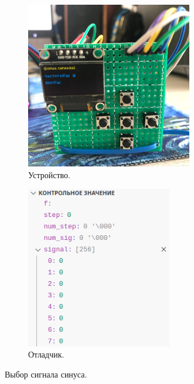 	\begin{figure}[H]
     \begin{subfigure}[H]{0.5\textwidth}
         \centering
         \includegraphics[width=0.8\textwidth]{../image/test0_u_s.jpg}
         \caption{Устройство.}
     \end{subfigure}
     \hfill
     \begin{subfigure}[H]{0.5\textwidth}
         \centering
         \includegraphics[width=0.7\textwidth]{../image/test0_o_s.png}
         \caption{Отладчик.}
     \end{subfigure}
        \caption{Выбор сигнала синуса.}
	\end{figure}
	
